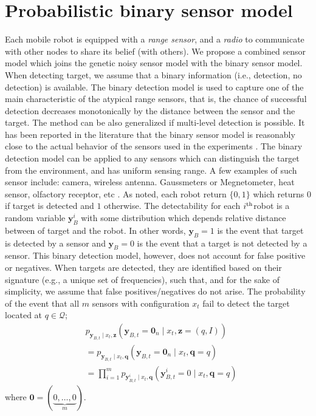 \documentclass[journal]{IEEEtran}
\begin{document}
\section{Probabilistic binary sensor model}
\label{sec:sec3}
Each mobile robot is equipped with a \emph{range sensor}, and a \emph{radio} to communicate with other nodes to share its belief (with others). 
We propose a combined sensor model which joins the genetic noisy sensor model with the binary sensor model. 
When detecting target, we assume that a binary information (i.e., detection, no detection) is available. The binary detection model is used to capture one of the main characteristic of the atypical range sensors, that is, the chance of successful detection decreases monotonically by the distance between the sensor and the target.
 The method can be also generalized if multi-level detection is possible. It has been reported in the literature that the binary sensor model is reasonably close to the actual behavior of the sensors used in the experiments \cite{djuric2008target}.
The binary detection model can be applied to any sensors which can distinguish the target from the environment, and has uniform sensing range. A few examples of such sensor include: camera, wireless antenna. Gaussmeters or Megnetometer, heat sensor, olfactory receptor, etc \cite{akyildiz2002survey}.
As noted, each robot return $\lbrace 0,1 \rbrace$ which returns $0$ if target is detected and $1$ otherwise. The detectability for each $i^{\textup{th}}$robot is a random variable $\bm{y}_B^i$ with some distribution which depends relative distance between of target and the robot. In other words, $\bm{y}_{B}=1$ is the event that target is detected by a sensor and $\bm{y}_{B}=0$ is the event that a target is not detected by a sensor. This binary detection model, however, does not account for false positive or negatives. When targets are detected, they are identified based on their signature (e.g., a unique set of frequencies), such that, and for the sake of simplicity, we assume that false positives/negatives do not arise. 
The probability of the event that all $m$ sensors with configuration $x_t$ fail to detect the target located at $q \in \mathcal{Q}$;
\begin{align*}
&p_{\bm{y}_{B,t} \mid
	{x}_{t},\bm{z}}\left(
\bm{y}_{B,t} = \bm{0}_n \mid {x}_{t},
\bm{z}=(q,I)\right) \\
&=p_{\bm{y}_{B,t} \mid
	{x}_{t},\bm{q}}\left(
\bm{y}_{B,t} = \bm{0}_n \mid {x}_{t},
\bm{q}=q\right) \\
&= \prod_{i=1}^m
p_{\bm{y}_{B,t}^i \mid
	{x}_{t},\bm{q}}\left(
\bm{y}_{B,t}^i = 0 \mid
{x}_{t},\bm{q}=q\right)
\end{align*}
where $\bm{0}= (\underbrace{0,\dots,0}_{m})$.
 
\end{document}
